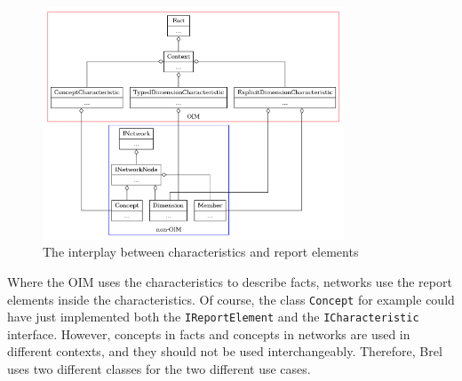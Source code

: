 \begin{figure}[H]
    \centering
    \includegraphics[width=0.8\textwidth]{images/brel_combine_api.png}
    \caption{The interplay between characteristics and report elements}
    \label{fig:brel_combine_api}
\end{figure}

Where the OIM uses the characteristics to describe facts, networks use the report elements inside the characteristics.
Of course, the class \texttt{Concept} for example could have just implemented both the \texttt{IReportElement} and the \texttt{ICharacteristic} interface.
However, concepts in facts and concepts in networks are used in different contexts, and they should not be used interchangeably.
Therefore, Brel uses two different classes for the two different use cases.

